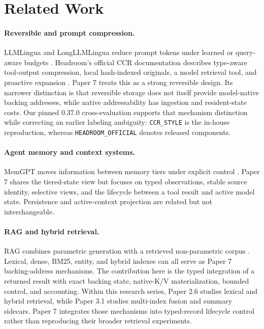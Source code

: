 \documentclass[11pt]{article}
\begin{document}
\section{Related Work}

\paragraph{Reversible and prompt compression.}
LLMLingua and LongLLMLingua reduce prompt tokens under learned or query-aware
budgets \cite{jiang2023llmlingua,jiang2023longllmlingua}. Headroom's official
CCR documentation describes type-aware tool-output compression, local
hash-indexed originals, a model retrieval tool, and proactive expansion
\cite{headroom2026ccr}. Paper 7 treats this as a strong reversible design.
Its narrower distinction is that reversible storage does not itself provide
model-native backing addresses, while native addressability has ingestion and
resident-state costs. Our pinned 0.37.0 cross-evaluation supports that
mechanism distinction while correcting an earlier labeling ambiguity:
\texttt{CCR\_STYLE} is the in-house reproduction, whereas
\texttt{HEADROOM\_OFFICIAL} denotes released components.

\paragraph{Agent memory and context systems.}
MemGPT moves information between memory tiers under explicit control
\cite{packer2023memgpt}. Paper 7 shares the tiered-state view but focuses on
typed observations, stable source identity, selective views, and the lifecycle
between a tool result and active model state. Persistence and active-context
projection are related but not interchangeable.

\paragraph{RAG and hybrid retrieval.}
RAG combines parametric generation with a retrieved non-parametric corpus
\cite{lewis2020rag}. Lexical, dense, BM25, entity, and hybrid indexes can all
serve as Paper 7 backing-address mechanisms. The contribution here is the typed
integration of a returned result with exact backing state, native-K/V
materialization, bounded control, and accounting. Within this research series,
Paper 2.6 studies lexical and hybrid retrieval, while Paper 3.1 studies
multi-index fusion and summary sidecars. Paper 7 integrates those mechanisms
into typed-record lifecycle control rather than reproducing their broader
retrieval experiments.
\end{document}
